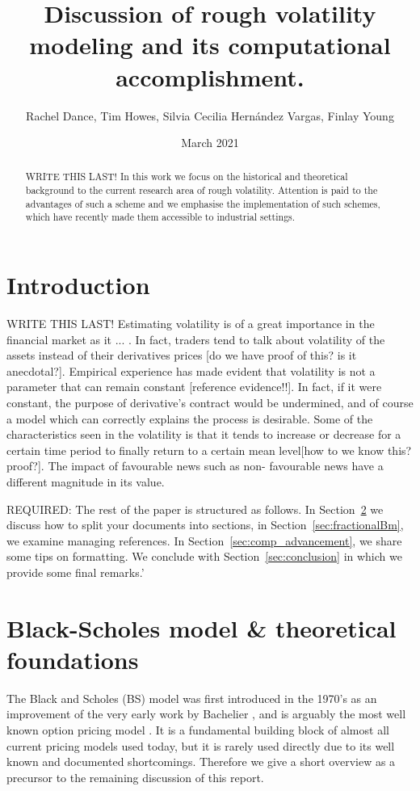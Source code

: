 \documentclass[12pt,oneside]{article}
\title{Discussion of rough volatility modeling and its computational accomplishment.}
\date{ March 2021 }
\author{Rachel Dance, Tim Howes, Silvia Cecilia Hernández Vargas, Finlay Young}
\begin{document}
  \maketitle

  \begin{abstract}WRITE THIS LAST! In this work we focus on the historical and theoretical background to the current research area of rough volatility. Attention is paid to the advantages of such a scheme and we emphasise the implementation of such schemes, which have recently made them accessible to industrial settings.
   \end{abstract}

  \tableofcontents
 \newpage

\section{Introduction}
WRITE THIS LAST!
Estimating volatility is of a great importance in the financial market as it ... . In fact, traders tend to talk about volatility of the assets instead of their derivatives prices [do we have proof of this? is it anecdotal?]. Empirical experience has made evident that volatility is not a parameter that can remain constant [reference evidence!!]. In fact, if it were constant, the purpose of derivative's contract would be undermined, and of course a model which can correctly explains the process is desirable. Some of the characteristics seen in the volatility is that it tends to increase or decrease for a certain time period to finally return to a certain mean level[how to we know this? proof?]. The impact of favourable news such as non- favourable news have a different magnitude in its value.

REQUIRED: The rest of the paper is structured as follows. In Section~\ref{sec:black_scholes_foundations} we discuss how to split your documents into sections, in Section~\ref{sec:fractionalBm}, we examine  managing  references. In Section~\ref{sec:comp_advancement}, we share some tips on formatting. We conclude with Section~\ref{sec:conclusion} in which we provide some final remarks.'



\section{Black-Scholes model \& theoretical foundations}
\label{sec:black_scholes_foundations}
The Black and Scholes (BS) model was first introduced in the 1970's as an improvement of the very early work by Bachelier \cite{Bachelier1900}, and is arguably the most well known option pricing model \cite{BlackScholes1973}. It is a fundamental building block of almost all current pricing models used today, but it is rarely used directly due to its well known and documented shortcomings. Therefore we give a short overview as a precursor to the remaining discussion of this report.
\end{document}
